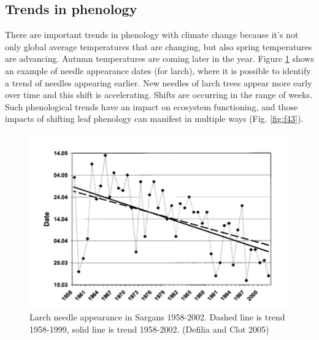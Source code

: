 \documentclass[
  12pt,
  oneside]{book}
\begin{document}
\hypertarget{trends-in-phenology}{%
\subsection{Trends in phenology}\label{trends-in-phenology}}

There are important trends in phenology with climate change because it's not only global average temperatures that are changing, but also spring temperatures are advancing. Autumn temperatures are coming later in the year. Figure \ref{fig:f42} shows an example of needle appearance dates (for larch), where it is possible to identify a trend of needles appearing earlier. New needles of larch trees appear more early over time and this shift is accelerating. Shifts are occurring in the range of weeks. Such phenological trends have an impact on ecosystem functioning, and those impacts of shifting leaf phenology can manifest in multiple ways (Fig. \ref{fig:f43}).

\begin{figure}

{\centering \includegraphics[width=0.8\linewidth]{figures/chap4/f42_Defilia} 

}

\caption{Larch needle appearance in Sargans 1958-2002. Dashed line is trend 1958-1999, solid line is trend 1958-2002.  (Defilia and Clot 2005)}\label{fig:f42}
\end{figure}
\end{document}
